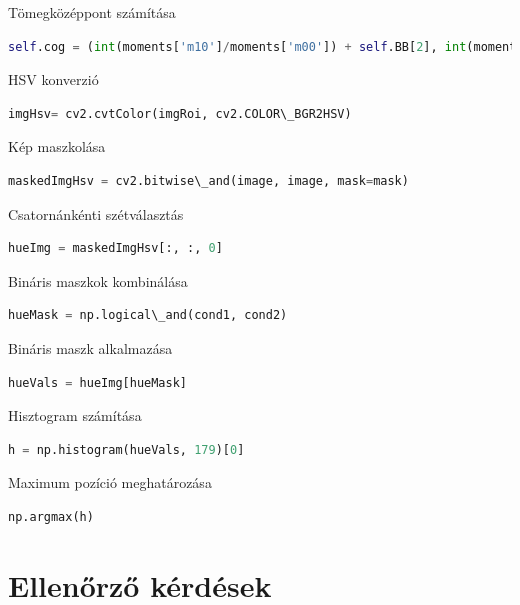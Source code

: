 \documentclass[12pt,a4paper,oneside]{report}             %
\begin{document}
Tömegközéppont számítása

\begin{lstlisting}[language=Python]
self.cog = (int(moments['m10']/moments['m00']) + self.BB[2], int(moments['m01']/moments['m00']) + self.BB[0])
\end{lstlisting}

HSV konverzió

\begin{lstlisting}[language=Python]
imgHsv= cv2.cvtColor(imgRoi, cv2.COLOR\_BGR2HSV)
\end{lstlisting}

Kép maszkolása

\begin{lstlisting}[language=Python]
maskedImgHsv = cv2.bitwise\_and(image, image, mask=mask)
\end{lstlisting}

Csatornánkénti szétválasztás

\begin{lstlisting}[language=Python]
hueImg = maskedImgHsv[:, :, 0]
\end{lstlisting}

Bináris maszkok kombinálása

\begin{lstlisting}[language=Python]
hueMask = np.logical\_and(cond1, cond2)
\end{lstlisting}

Bináris maszk alkalmazása

\begin{lstlisting}[language=Python]
hueVals = hueImg[hueMask]
\end{lstlisting}

Hisztogram számítása

\begin{lstlisting}[language=Python]
h = np.histogram(hueVals, 179)[0]
\end{lstlisting}

Maximum pozíció meghatározása

\begin{lstlisting}[language=Python]
np.argmax(h) 
\end{lstlisting}


\chapter{Ellenőrző kérdések}
\end{document}
